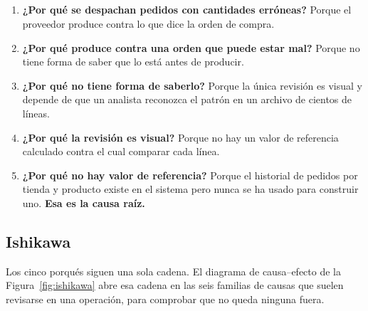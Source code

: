 
\subsection{\texorpdfstring{}{Por qué pasa, en cinco porqués}}

\begin{enumerate}
\item \textbf{¿Por qué se despachan pedidos con cantidades erróneas?} Porque el proveedor produce contra lo que dice la orden de compra.
\item \textbf{¿Por qué produce contra una orden que puede estar mal?} Porque no tiene forma de saber que lo está antes de producir.
\item \textbf{¿Por qué no tiene forma de saberlo?} Porque la única revisión es visual y depende de que un analista reconozca el patrón en un archivo de cientos de líneas.
\item \textbf{¿Por qué la revisión es visual?} Porque no hay un valor de referencia calculado contra el cual comparar cada línea.
\item \textbf{¿Por qué no hay valor de referencia?} Porque el historial de pedidos por tienda y producto existe en el sistema pero nunca se ha usado para construir uno. \textbf{Esa es la causa raíz.}
\end{enumerate}


\subsection{Ishikawa}

Los cinco porqués siguen una sola cadena. El diagrama de causa--efecto de la Figura~\ref{fig:ishikawa} abre esa cadena en las seis familias de causas que suelen revisarse en una operación, para comprobar que no queda ninguna fuera.

